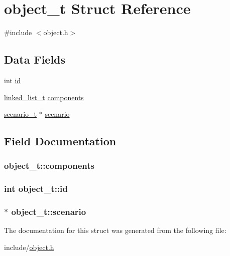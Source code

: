 \hypertarget{structobject__t}{}\section{object\+\_\+t Struct Reference}
\label{structobject__t}


{\ttfamily \#include $<$object.\+h$>$}

\subsection*{Data Fields}
\begin{DoxyCompactItemize}
\item 
int \hyperlink{structobject__t_a9f34931fd2aceef966c6fa3230a8c5db}{id}
\item 
\hyperlink{structlinked__list__t}{linked\+\_\+list\+\_\+t} \hyperlink{structobject__t_a8e5efa8b7b5a6772f372efba300a9c01}{components}
\item 
\hyperlink{structscenario__t}{scenario\+\_\+t} $\ast$ \hyperlink{structobject__t_aa3f8f0db477d6396b00d03b204c07329}{scenario}
\end{DoxyCompactItemize}


\subsection{Field Documentation}
\subsubsection[{\texorpdfstring{components}{components}}]{ object\+\_\+t\+::components}\hypertarget{structobject__t_a8e5efa8b7b5a6772f372efba300a9c01}{}\label{structobject__t_a8e5efa8b7b5a6772f372efba300a9c01}
\subsubsection[{\texorpdfstring{id}{id}}]{\setlength{\rightskip}{0pt plus 5cm}int object\+\_\+t\+::id}\hypertarget{structobject__t_a9f34931fd2aceef966c6fa3230a8c5db}{}\label{structobject__t_a9f34931fd2aceef966c6fa3230a8c5db}
\subsubsection[{\texorpdfstring{scenario}{scenario}}]{$\ast$ object\+\_\+t\+::scenario}\hypertarget{structobject__t_aa3f8f0db477d6396b00d03b204c07329}{}\label{structobject__t_aa3f8f0db477d6396b00d03b204c07329}


The documentation for this struct was generated from the following file\+:\begin{DoxyCompactItemize}
\item 
include/\hyperlink{object_8h}{object.\+h}\end{DoxyCompactItemize}

